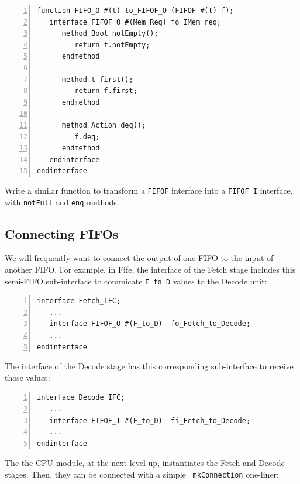 {\small
\begin{Verbatim}[frame=single, numbers=left]
function FIFO_O #(t) to_FIFOF_O (FIFOF #(t) f);
   interface FIFOF_O #(Mem_Req) fo_IMem_req;
      method Bool notEmpty();
         return f.notEmpty;
      endmethod

      method t first();
         return f.first;
      endmethod

      method Action deq();
         f.deq;
      endmethod
   endinterface
endinterface
\end{Verbatim}
}

\hdivider

\Exercise

Write a similar function to transform a \verb|FIFOF| interface into a
\verb|FIFOF_I| interface, with \verb|notFull| and \verb|enq| methods.

\Endexercise


\subsection{Connecting FIFOs}

\label{Sec_connecting_FIFOs}


We will frequently want to connect the output of one FIFO to the input
of another FIFO.  For example, in Fife, the interface of the Fetch
stage includes this semi-FIFO sub-interface to commicate \verb|F_to_D|
values to the Decode unit:

{\small
\begin{Verbatim}[frame=single, numbers=left]
interface Fetch_IFC;
   ...
   interface FIFOF_O #(F_to_D)  fo_Fetch_to_Decode;
   ...
endinterface
\end{Verbatim}
}

The interface of the Decode stage has this corresponding sub-interface
to receive those values:

{\small
\begin{Verbatim}[frame=single, numbers=left]
interface Decode_IFC;
   ...
   interface FIFOF_I #(F_to_D)  fi_Fetch_to_Decode;
   ...
endinterface
\end{Verbatim}
}

The the CPU module, at the next level up, instantiates the Fetch and
Decode stages.  Then, they can be connected with a simple {\tt
mkConnection} one-liner:

